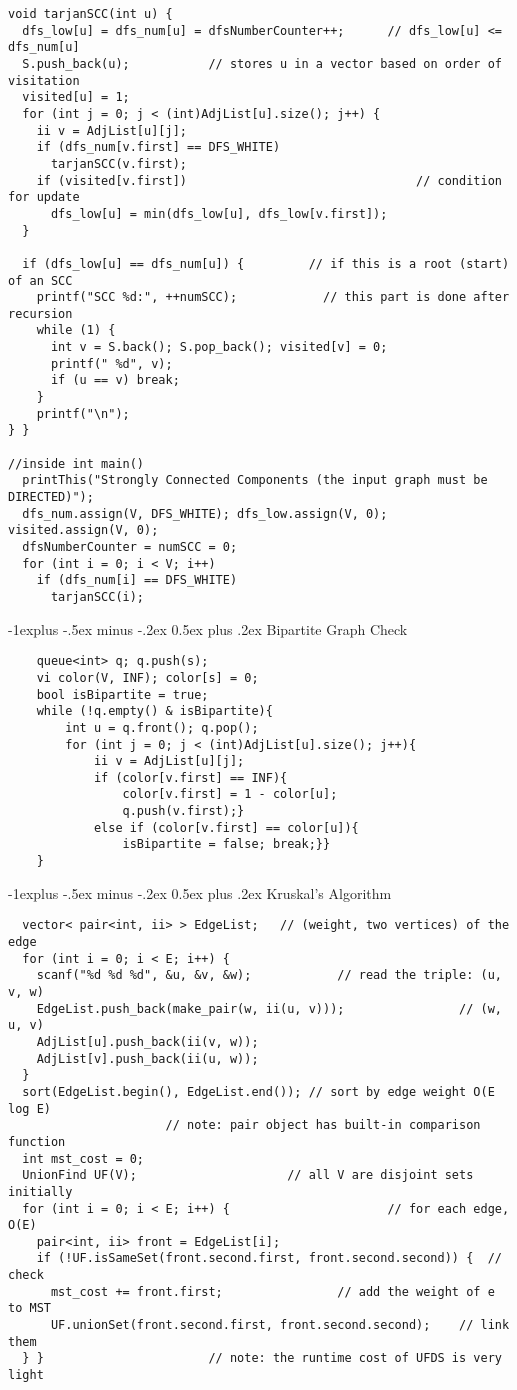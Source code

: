 \documentclass[10pt,landscape]{article}
\makeatletter
\renewcommand{\subsection}{\@startsection{subsection}{2}{0mm}%
                                {-1explus -.5ex minus -.2ex}%
                                {0.5ex plus .2ex}%
                                {\normalfont\normalsize\bfseries}}
\makeatother
\begin{document}
\begin{multicols}{2}
\begin{lstlisting}
void tarjanSCC(int u) {
  dfs_low[u] = dfs_num[u] = dfsNumberCounter++;      // dfs_low[u] <= dfs_num[u]
  S.push_back(u);           // stores u in a vector based on order of visitation
  visited[u] = 1;
  for (int j = 0; j < (int)AdjList[u].size(); j++) {
    ii v = AdjList[u][j];
    if (dfs_num[v.first] == DFS_WHITE)
      tarjanSCC(v.first);
    if (visited[v.first])                                // condition for update
      dfs_low[u] = min(dfs_low[u], dfs_low[v.first]);
  }

  if (dfs_low[u] == dfs_num[u]) {         // if this is a root (start) of an SCC
    printf("SCC %d:", ++numSCC);            // this part is done after recursion
    while (1) {
      int v = S.back(); S.pop_back(); visited[v] = 0;
      printf(" %d", v);
      if (u == v) break;
    }
    printf("\n");
} }

//inside int main()
  printThis("Strongly Connected Components (the input graph must be DIRECTED)");
  dfs_num.assign(V, DFS_WHITE); dfs_low.assign(V, 0); visited.assign(V, 0);
  dfsNumberCounter = numSCC = 0;
  for (int i = 0; i < V; i++)
    if (dfs_num[i] == DFS_WHITE)
      tarjanSCC(i);
\end{lstlisting}

\subsection{Bipartite Graph Check}
\begin{lstlisting}
	queue<int> q; q.push(s);
	vi color(V, INF); color[s] = 0;
	bool isBipartite = true;
	while (!q.empty() & isBipartite){
		int u = q.front(); q.pop();
		for (int j = 0; j < (int)AdjList[u].size(); j++){
			ii v = AdjList[u][j];
			if (color[v.first] == INF){
				color[v.first] = 1 - color[u];
				q.push(v.first);}
			else if (color[v.first] == color[u]){
				isBipartite = false; break;}}
	}
\end{lstlisting}

\subsection{Kruskal's Algorithm}
\begin{lstlisting}
  vector< pair<int, ii> > EdgeList;   // (weight, two vertices) of the edge
  for (int i = 0; i < E; i++) {
    scanf("%d %d %d", &u, &v, &w);            // read the triple: (u, v, w)
    EdgeList.push_back(make_pair(w, ii(u, v)));                // (w, u, v)
    AdjList[u].push_back(ii(v, w));
    AdjList[v].push_back(ii(u, w));
  }
  sort(EdgeList.begin(), EdgeList.end()); // sort by edge weight O(E log E)
                      // note: pair object has built-in comparison function
  int mst_cost = 0;
  UnionFind UF(V);                     // all V are disjoint sets initially
  for (int i = 0; i < E; i++) {                      // for each edge, O(E)
    pair<int, ii> front = EdgeList[i];
    if (!UF.isSameSet(front.second.first, front.second.second)) {  // check
      mst_cost += front.first;                // add the weight of e to MST
      UF.unionSet(front.second.first, front.second.second);    // link them
  } }                       // note: the runtime cost of UFDS is very light


\end{lstlisting}
\end{multicols}
\end{document}
